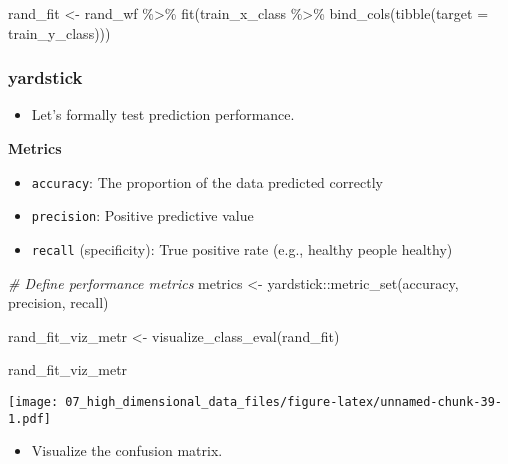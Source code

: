 \documentclass[
]{book}
\newenvironment{Shaded}{\begin{snugshade}}{\end{snugshade}}
\newcommand{\AttributeTok}[1]{\textcolor[rgb]{0.77,0.63,0.00}{#1}}
\newcommand{\CommentTok}[1]{\textcolor[rgb]{0.56,0.35,0.01}{\textit{#1}}}
\newcommand{\FunctionTok}[1]{\textcolor[rgb]{0.00,0.00,0.00}{#1}}
\newcommand{\NormalTok}[1]{#1}
\newcommand{\OtherTok}[1]{\textcolor[rgb]{0.56,0.35,0.01}{#1}}
\newcommand{\SpecialCharTok}[1]{\textcolor[rgb]{0.00,0.00,0.00}{#1}}
\providecommand{\tightlist}{%
  \setlength{\itemsep}{0pt}\setlength{\parskip}{0pt}}
\begin{document}
\begin{Shaded}
\begin{Highlighting}[]
\NormalTok{rand\_fit }\OtherTok{\textless{}{-}}\NormalTok{ rand\_wf }\SpecialCharTok{\%\textgreater{}\%} \FunctionTok{fit}\NormalTok{(train\_x\_class }\SpecialCharTok{\%\textgreater{}\%} \FunctionTok{bind\_cols}\NormalTok{(}\FunctionTok{tibble}\NormalTok{(}\AttributeTok{target =}\NormalTok{ train\_y\_class)))}
\end{Highlighting}
\end{Shaded}

\hypertarget{yardstick-2}{%
\subsubsection{yardstick}\label{yardstick-2}}

\begin{itemize}
\tightlist
\item
  Let's formally test prediction performance.
\end{itemize}

\textbf{Metrics}

\begin{itemize}
\item
  \texttt{accuracy}: The proportion of the data predicted correctly
\item
  \texttt{precision}: Positive predictive value
\item
  \texttt{recall} (specificity): True positive rate (e.g., healthy people healthy)
\end{itemize}

\begin{Shaded}
\begin{Highlighting}[]
\CommentTok{\# Define performance metrics }
\NormalTok{metrics }\OtherTok{\textless{}{-}}\NormalTok{ yardstick}\SpecialCharTok{::}\FunctionTok{metric\_set}\NormalTok{(accuracy, precision, recall)}

\NormalTok{rand\_fit\_viz\_metr }\OtherTok{\textless{}{-}} \FunctionTok{visualize\_class\_eval}\NormalTok{(rand\_fit)}

\NormalTok{rand\_fit\_viz\_metr}
\end{Highlighting}
\end{Shaded}

\texttt{[image: 07\_high\_dimensional\_data\_files/figure-latex/unnamed-chunk-39-1.pdf]}

\begin{itemize}
\tightlist
\item
  Visualize the confusion matrix.
\end{itemize}
\end{document}
